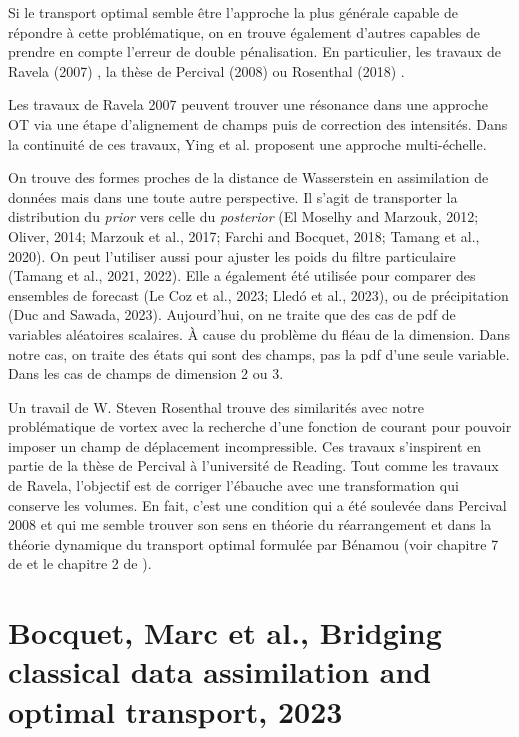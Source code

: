 \documentclass{article}
\begin{document}
Si le transport optimal semble être l'approche la plus générale capable de répondre à cette problématique, on en trouve également d'autres capables de prendre en compte l'erreur de double pénalisation. En particulier, les travaux de Ravela (2007) \cite{ravela_data_2007}, la thèse de Percival (2008) ou Rosenthal (2018) \cite{rosenthal_displacement_2017}.

Les travaux de Ravela 2007 \cite{ravela_data_2007} peuvent trouver une résonance dans une approche OT via une étape d'alignement de champs puis de correction des intensités. Dans la continuité de ces travaux, Ying et al. \cite{ying_multiscale_2019, ying_improving_2023} proposent une approche multi-échelle.

On trouve des formes proches de la distance de Wasserstein en assimilation de données mais dans une toute autre perspective. Il s'agit de transporter la distribution du \textit{prior} vers celle du \textit{posterior} (El Moselhy and Marzouk, 2012; Oliver, 2014; Marzouk et al., 2017; Farchi and Bocquet, 2018; Tamang et al., 2020). On peut l'utiliser aussi pour ajuster les poids du filtre particulaire (Tamang et al., 2021, 2022). Elle a également été utilisée pour comparer des ensembles de forecast (Le Coz et al., 2023; Lledó et al., 2023), ou de précipitation (Duc and Sawada, 2023).
Aujourd'hui, on ne traite que des cas de pdf de variables aléatoires scalaires. À cause du problème du fléau de la dimension.
Dans notre cas, on traite des états qui sont des champs, pas la pdf d'une seule variable. Dans les cas de champs de dimension 2 ou 3.

Un travail de W. Steven Rosenthal \cite{rosenthal_displacement_2017} trouve des similarités avec notre problématique de vortex avec la recherche d'une fonction de courant pour pouvoir imposer un champ de déplacement incompressible. Ces travaux s'inspirent en partie de la thèse de Percival à l'université de Reading. Tout comme les travaux de Ravela, l'objectif est de corriger l'ébauche avec une transformation qui conserve les volumes. En fait, c'est une condition qui a été soulevée dans Percival 2008 et qui me semble trouver son sens en théorie du réarrangement et dans la théorie dynamique du transport optimal formulée par Bénamou (voir chapitre 7 de \cite{peyre_computational_2020} et le chapitre 2 de \cite{feyeux_transport_nodate}).

\section{Bocquet, Marc et al., Bridging classical data assimilation and optimal transport, 2023}
\end{document}
